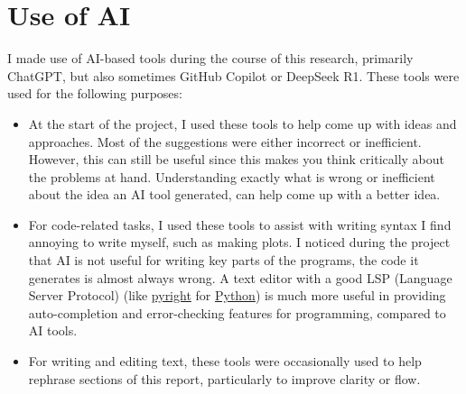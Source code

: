 \section{Use of AI}
I made use of AI-based tools during the course of this research, primarily ChatGPT, but also sometimes GitHub Copilot or DeepSeek R1.
These tools were used for the following purposes:
\begin{itemize}
	\item At the start of the project, I used these tools to help come up with ideas and approaches.
	      Most of the suggestions were either incorrect or inefficient.
	      However, this can still be useful since this makes you think critically about the problems at hand.
	      Understanding exactly what is wrong or inefficient about the idea an AI tool generated, can help come up with a better idea.
	\item For code-related tasks, I used these tools to assist with writing syntax I find annoying to write myself, such as making plots.
	      I noticed during the project that AI is not useful for writing key parts of the programs, the code it generates is almost always wrong.
	      A text editor with a good LSP (Language Server Protocol) (like \url{pyright} for \url{Python}) is much more useful in providing auto-completion and error-checking features for programming, compared to AI tools.
	\item For writing and editing text, these tools were occasionally used to help rephrase sections of this report, particularly to improve clarity or flow.
\end{itemize}

